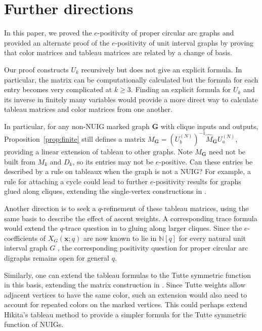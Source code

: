 \documentclass[12pt]{article}
\theoremstyle{plain}
\theoremstyle{definition}
\theoremstyle{remark}
\newcommand{\bN}{\mathbb{N}}
\newcommand{\bG}{\mathbf{G}}
\begin{document}
\section{Further directions}\label{section:conclusions}

In this paper, we proved the $e$-positivity of proper circular arc graphs and provided an alternate proof of the $e$-positivity of unit interval graphs by proving that color matrices and tableau matrices are related by a change of basis.

Our proof constructs $U_k$ recursively but does not give an explicit formula. In particular, the matrix can be computationally calculated but the formula for each entry becomes very complicated at $k\geq 3$. Finding an explicit formula for $U_k$ and its inverse in finitely many variables would provide a more direct way to calculate tableau matrices and color matrices from one another.

In particular, for any non-NUIG marked graph $\bG$ with clique inputs and outputs, Proposition~\ref{prop:finite} still defines a matrix $M_{\bG}=(U_b^{(N)})^{-1}\hat M_\bG U_a^{(N)}$, providing a linear extension of tableau to other graphs. Note $M_{\bG}$ need not be built from $M_k$ and $D_k$, so its entries may not be $e$-positive. Can these entries be described by a rule on tableaux when the graph is not a NUIG? For example, a rule for attaching a cycle could lead to further $e$-positivity results for graphs glued along cliques, extending the
single-vertex constructions in \cite{singlegluing}.

 
Another direction is to seek a $q$-refinement of these tableau matrices, using the same basis to describe the effect of ascent weights. A corresponding trace formula would extend the $q$-trace question in \cite[Conjecture 74]{singlegluing} to gluing along larger cliques. Since the $e$-coefficients of
$X_G(\bm x;q)$ are now known to lie in $\bN[q]$ for every natural unit
interval graph $G$ \cite{openaichrom}, the corresponding positivity
question for proper circular arc digraphs remains open for general $q$.


Similarly, one can extend the tableau formulas to the
Tutte symmetric function in this basis, extending the matrix
construction in \cite{tuttematrix}. Since Tutte weights allow adjacent
vertices to have the same color, such an extension would also need to
account for repeated colors on the marked vertices. This could perhaps extend Hikita's tableau method to provide a simpler formula for the Tutte symmetric function of NUIGs.
\end{document}

